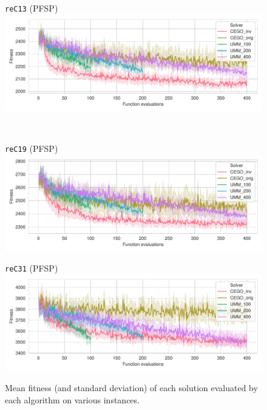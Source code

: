 \documentclass[sigconf,dvipsnames]{acmart}
\begin{document}
\begin{figure}[tb]
\begin{minipage}{0.49\linewidth}
\end{minipage}
\begin{minipage}{0.49\linewidth}
  \texttt{reC13} (PFSP)\\[-0.5ex]
  \includegraphics[width=\textwidth]{../img/fitness_pfsp_rec13_txt}
\end{minipage}
\\
\begin{minipage}{0.49\linewidth}
  \texttt{reC19} (PFSP)\\[-0.5ex]
  \includegraphics[width=\textwidth]{../img/fitness_pfsp_rec19_txt}
\end{minipage}
\begin{minipage}{0.49\linewidth}
  \texttt{reC31} (PFSP)\\[-0.5ex]
  \includegraphics[width=\textwidth]{../img/fitness_pfsp_rec31_txt}
\end{minipage}
\label{fig:results}
\caption{Mean fitness  (and standard deviation)  of each solution evaluated by each algorithm on various instances.\label{fig:results}}
\end{figure}
\end{document}
